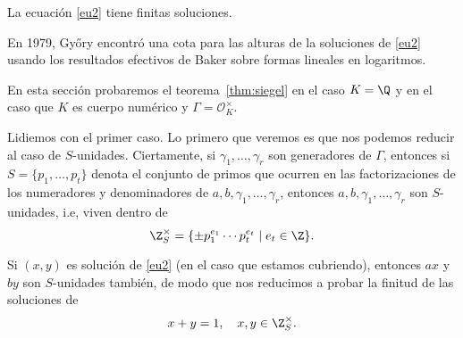\documentclass[11pt, reqno]{amsart}
\begin{document}
\begin{thm}
	\label{thm:siegel}
	La ecuación \eqref{eu2} tiene finitas soluciones.
\end{thm}

En 1979, Győry encontró una cota para las alturas de la soluciones de \eqref{eu2} usando los resultados efectivos de Baker sobre formas lineales en logaritmos.

En esta sección probaremos el teorema~\ref{thm:siegel} en el caso $K=\Q$ y en el caso que $K$ es cuerpo numérico y $\Gamma=\mathcal{O}_K^{\times}$.

Lidiemos con el primer caso. Lo primero que veremos es que nos podemos reducir al caso de $S$-unidades. Ciertamente, si $\gamma_1,\ldots,\gamma_r$ son generadores de $\Gamma$, entonces si $S=\{p_1,\ldots,p_t\}$ denota el conjunto de primos que ocurren en las factorizaciones de los numeradores y denominadores de $a,b,\gamma_1,\ldots,\gamma_r$, entonces $a,b,\gamma_1,\ldots,\gamma_r$ son $S$-unidades, i.e, viven dentro de $$\Z_S^{\times}=\{\pm p_1^{e_1}\cdots p_t^{e_t}\mid e_t\in \Z\}.$$

Si $(x,y)$ es solución de \eqref{eu2} (en el caso que estamos cubriendo), entonces $ax$ y $by$ son $S$-unidades también, de modo que nos reducimos a probar la finitud de las soluciones de
\begin{equation}
	\label{eus}
	x+y=1,\quad x,y\in \Z_S^{\times}.
\end{equation}
\end{document}
